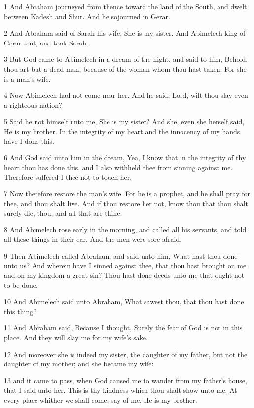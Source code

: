 \par 1 And Abraham journeyed from thence toward the land of the South, and dwelt between Kadesh and Shur. And he sojourned in Gerar.
\par 2 And Abraham said of Sarah his wife, She is my sister. And Abimelech king of Gerar sent, and took Sarah.
\par 3 But God came to Abimelech in a dream of the night, and said to him, Behold, thou art but a dead man, because of the woman whom thou hast taken. For she is a man's wife.
\par 4 Now Abimelech had not come near her. And he said, Lord, wilt thou slay even a righteous nation?
\par 5 Said he not himself unto me, She is my sister? And she, even she herself said, He is my brother. In the integrity of my heart and the innocency of my hands have I done this.
\par 6 And God said unto him in the dream, Yea, I know that in the integrity of thy heart thou has done this, and I also withheld thee from sinning against me. Therefore suffered I thee not to touch her.
\par 7 Now therefore restore the man's wife. For he is a prophet, and he shall pray for thee, and thou shalt live. And if thou restore her not, know thou that thou shalt surely die, thou, and all that are thine.
\par 8 And Abimelech rose early in the morning, and called all his servants, and told all these things in their ear. And the men were sore afraid.
\par 9 Then Abimelech called Abraham, and said unto him, What hast thou done unto us? And wherein have I sinned against thee, that thou hast brought on me and on my kingdom a great sin? Thou hast done deeds unto me that ought not to be done.
\par 10 And Abimelech said unto Abraham, What sawest thou, that thou hast done this thing?
\par 11 And Abraham said, Because I thought, Surely the fear of God is not in this place. And they will slay me for my wife's sake.
\par 12 And moreover she is indeed my sister, the daughter of my father, but not the daughter of my mother; and she became my wife:
\par 13 and it came to pass, when God caused me to wander from my father's house, that I said unto her, This is thy kindness which thou shalt show unto me. At every place whither we shall come, say of me, He is my brother.
